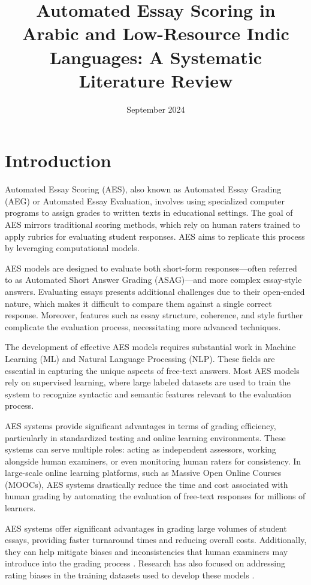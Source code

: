 \documentclass{article}
\title{Automated Essay Scoring in Arabic and Low-Resource Indic Languages: A Systematic Literature Review}
\date{September 2024}
\begin{document}
    
	
	\maketitle
	\section{Introduction}
	Automated Essay Scoring (AES), also known as Automated Essay Grading (AEG) or Automated Essay Evaluation, involves using specialized computer programs to assign grades to written texts in educational settings. The goal of AES mirrors traditional scoring methods, which rely on human raters trained to apply rubrics for evaluating student responses. AES aims to replicate this process by leveraging computational models.
	
	AES models are designed to evaluate both short-form responses—often referred to as Automated Short Answer Grading (ASAG)—and more complex essay-style answers. Evaluating essays presents additional challenges due to their open-ended nature, which makes it difficult to compare them against a single correct response. Moreover, features such as essay structure, coherence, and style further complicate the evaluation process, necessitating more advanced techniques.
	
	The development of effective AES models requires substantial work in Machine Learning (ML) and Natural Language Processing (NLP). These fields are essential in capturing the unique aspects of free-text answers. Most AES models rely on supervised learning, where large labeled datasets are used to train the system to recognize syntactic and semantic features relevant to the evaluation process.
	
	AES systems provide significant advantages in terms of grading efficiency, particularly in standardized testing and online learning environments. These systems can serve multiple roles: acting as independent assessors, working alongside human examiners, or even monitoring human raters for consistency. In large-scale online learning platforms, such as Massive Open Online Courses (MOOCs), AES systems drastically reduce the time and cost associated with human grading by automating the evaluation of free-text responses for millions of learners.
	
	AES systems offer significant advantages in grading large volumes of student essays, providing faster turnaround times and reducing overall costs. Additionally, they can help mitigate biases and inconsistencies that human examiners may introduce into the grading process \cite{malouff2016bias}. Research has also focused on addressing rating biases in the training datasets used to develop these models \cite{amorim2018aesbias}.
	
\end{document}
